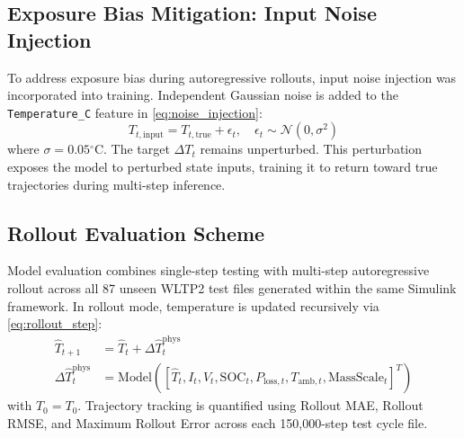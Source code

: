 \subsection{Exposure Bias Mitigation: Input Noise Injection}
To address exposure bias during autoregressive rollouts, input noise injection was incorporated into training. Independent Gaussian noise is added to the \texttt{Temperature\_C} feature in \eqref{eq:noise_injection}:
\begin{equation}
T_{t,\text{input}} = T_{t,\text{true}} + \epsilon_t, \quad \epsilon_t \sim \mathcal{N}(0, \sigma^2)
\label{eq:noise_injection}
\end{equation}
where $\sigma = 0.05$$^\circ$C. The target $\Delta T_t$ remains unperturbed. This perturbation exposes the model to perturbed state inputs, training it to return toward true trajectories during multi-step inference.

\subsection{Rollout Evaluation Scheme}
Model evaluation combines single-step testing with multi-step autoregressive rollout across all 87 unseen WLTP2 test files generated within the same Simulink framework. In rollout mode, temperature is updated recursively via \eqref{eq:rollout_step}:
\begin{align}
\hat{T}_{t+1} &= \hat{T}_t + \Delta \hat{T}_t^{\text{phys}} \\
\Delta \hat{T}_t^{\text{phys}} &= \text{Model}([\hat{T}_t, I_t, V_t, \text{SOC}_t, P_{\text{loss}, t}, T_{\text{amb}, t}, \text{MassScale}_t]^T)
\label{eq:rollout_step}
\end{align}
with $\hat{T}_0 = T_0$. Trajectory tracking is quantified using Rollout MAE, Rollout RMSE, and Maximum Rollout Error across each 150,000-step test cycle file.
